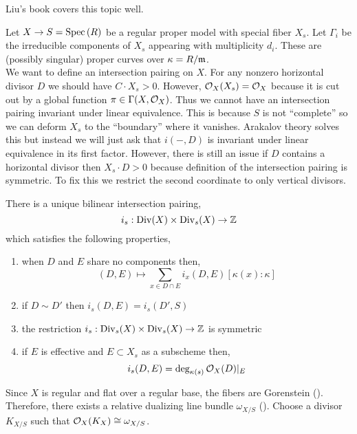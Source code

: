 \documentclass[12pt]{article}
\begin{document}
\begin{rmk}
Liu's book covers this topic well. 
\end{rmk}
\renewcommand{\Div}{\mathrm{Div}}

Let $X \to S = \mathrm{Spec}\left( R \right)$ be a regular proper model with special fiber $X_s$. Let $\Gamma_i$ be the irreducible components of $X_s$ appearing with multiplicity $d_i$. These are (possibly singular) proper curves over $\kappa = R / \mathfrak{m}$. 
\bigskip\\
We want to define an intersection pairing on $X$.  For any nonzero horizontal divisor $D$ we should have $C \cdot X_s > 0$. However, $\mathcal{O}_{X}(X_s) = \mathcal{O}_{X}$ because it is cut out by a global function $\pi \in \Gamma(X, \mathcal{O}_{X})$. Thus we cannot have an intersection pairing invariant under linear equivalence. This is because $S$ is not ``complete'' so we can deform $X_s$ to the ``boundary'' where it vanishes. Arakalov theory solves this but instead we will just ask that $i(-,D)$ is invariant under linear equivalence in its first factor. However, there is still an issue if $D$ contains a horizontal divisor then $X_s \cdot D > 0$ because definition of the intersection pairing is symmetric. To fix this we restrict the second coordinate to only vertical divisors.

\begin{lemma}
There is a unique bilinear intersection pairing,
\[ i_s :  \Div(X) \times \Div_s(X) \to \Z \]
which satisfies the following properties,
\begin{enumerate}
\item when $D$ and $E$ share no components then,
\[ (D, E) \mapsto \sum_{x \in D \cap E} i_x(D, E) [\kappa(x) : \kappa] \]

\item if $D \sim D'$ then $i_s(D, E) = i_s(D', S)$

\item the restriction $i_s : \Div_s(X) \times \Div_s(X) \to \Z$ is symmetric

\item if $E$ is effective and $E \subset X_s$ as a subscheme then,
\[ i_s(D, E) = \deg_{\kappa(s)} \mathcal{O}_{X}(D)|_E \]
\end{enumerate}
\end{lemma}

Since $X$ is regular and flat over a regular base, the fibers are Gorenstein (). Therefore, there exists a relative dualizing line bundle $\omega_{X/S}$ (). Choose a divisor $K_{X/S}$ such that $\mathcal{O}_{X}(K_X) \cong \omega_{X/S}$.  
\end{document}
